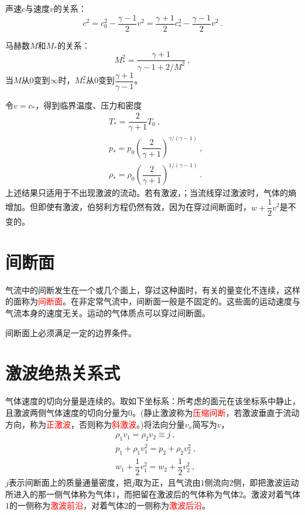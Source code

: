 \documentclass[12pt,a4paper]{article}
\begin{document}
声速$c$与速度$v$的关系：
\begin{equation}
c^2 = c_0^2 - \dfrac{\gamma-1}{2} v^2 = \dfrac{\gamma+1}{2} c_\ast^2 - \dfrac{\gamma-1}{2} v^2 ~.
\end{equation}

马赫数$M$和$M_\ast$的关系：
\begin{equation}
M_\ast^2 = \dfrac{\gamma+1}{\gamma -1+2/M^2} ~,
\end{equation}
当$M$从$0$变到$\infty$时，$M_\ast^2$从$0$变到$\dfrac{\gamma+1}{\gamma-1}$。

令$v = c_\ast$，得到临界温度、压力和密度
\begin{align}
& T_\ast = \dfrac{2}{\gamma+1} T_0 ~, \\
& p_\ast = p_0 \left(\dfrac{2}{\gamma+1} \right)^{\gamma/(\gamma-1)} ~, \\
& \rho_\ast = \rho_0 \left(\dfrac{2}{\gamma+1} \right)^{1/(\gamma-1)}  ~.
\end{align}
上述结果只适用于不出现激波的流动。若有激波，；当流线穿过激波时，气体的熵增加。但即使有激波，伯努利方程仍然有效，因为在穿过间断面时，$w + \dfrac{1}{2} v^2$是不变的。


\section{间断面}
气流中的间断发生在一个或几个面上，穿过这种面时，有关的量变化不连续，这样的面称为\textcolor{red}{间断面}。在非定常气流中，间断面一般是不固定的。这些面的运动速度与气流本身的速度无关。运动的气体质点可以穿过间断面。

间断面上必须满足一定的边界条件。





















\section{激波绝热关系式}
气体速度的切向分量是连续的。取如下坐标系：所考虑的面元在该坐标系中静止，且激波两侧气体速度的切向分量为$0$。(静止激波称为\textcolor{red}{压缩间断}，若激波垂直于流动方向，称为\textcolor{red}{正激波}，否则称为\textcolor{red}{斜激波}。)将法向分量$v_x$简写为$v$，
\begin{align}
& \rho_1 v_1 = \rho_2 v_2 \equiv  j ~, \\
& p_1 +\rho_1 v_1^2 = p_2 +\rho_2 v_2^2 ~, \\
& w_1 +\dfrac{1}{2} v_1^2 = w_2 +\dfrac{1}{2} v_2^2 ~,
\end{align}
$j$表示间断面上的质量通量密度，把$j$取为正，且气流由$1$侧流向$2$侧，即把激波运动所进入的那一侧气体称为气体$1$，而把留在激波后的气体称为气体$2$。激波对着气体$1$的一侧称为\textcolor{red}{激波前沿}，对着气体$2$的一侧称为\textcolor{red}{激波后沿}。
\end{document}
